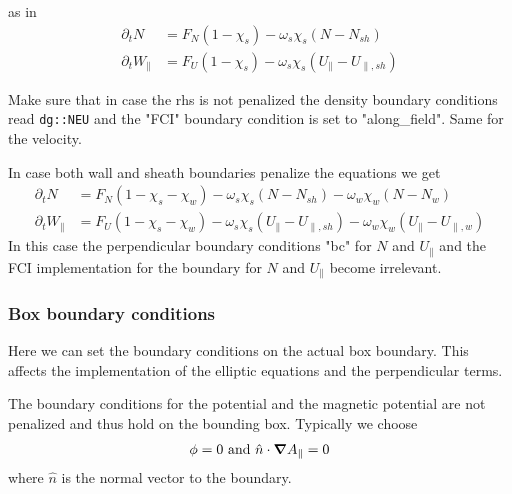 as in
\begin{subequations} \label{eq:sheath_equations}
\begin{align}
    \partial_t N &= F_N ( 1-\chi_s)  -\omega_s\chi_s (N-N_{sh})\\
    \partial_t W_\parallel &= F_U  ( 1 - \chi_s) -\omega_s\chi_s (U_\parallel-
        U_{\parallel,sh})
\end{align}
\end{subequations}
\begin{tcolorbox}[title=Note]
    Make sure that in case the rhs is not penalized the density boundary conditions
    read \texttt{dg::NEU} and the "FCI" boundary condition is set to "along\_field".
    Same for the velocity.
\end{tcolorbox}

\begin{tcolorbox}[title=Note]
    In case both wall and sheath boundaries penalize the equations we get
    \begin{subequations} \label{eq:sheath_wall_equations}
    \begin{align}
        \partial_t N &= F_N ( 1-\chi_s - \chi_w)  -\omega_s\chi_s (N-N_{sh}) -\omega_w\chi_w (N-N_{w})\\
        \partial_t W_\parallel &= F_U  ( 1 - \chi_s- \chi_w) -\omega_s \chi_s (U_\parallel - U_{\parallel,sh})-\omega_w\chi_w (U_\parallel- U_{\parallel,w})
    \end{align}
    \end{subequations}
    In this case the perpendicular boundary
    conditions "bc" for $N$ and $U_\parallel$ and the FCI implementation for the
    boundary for $N$ and $U_\parallel$ become irrelevant.
\end{tcolorbox}

\subsubsection{Box boundary conditions}
Here we can set the boundary conditions on the actual box boundary.
This affects the implementation of the elliptic equations and the
perpendicular terms.

The boundary conditions for the potential and the magnetic potential are not
penalized and thus hold on the bounding box. Typically we choose
\begin{align}
\phi = 0
\text{ and }  \hat n \cdot{\boldsymbol{\nabla}} A_{\parallel} = 0
\end{align}
where $\hat n$ is the normal vector to the boundary.

